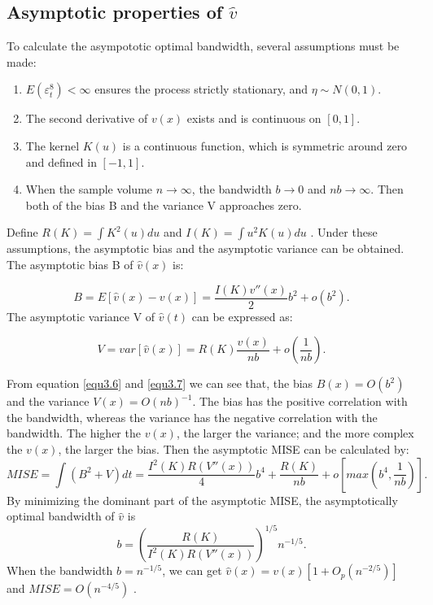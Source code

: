 \subsection{ Asymptotic properties of $\hat{v}$}
To calculate the asympototic optimal bandwidth, several assumptions must be made:
 \begin{enumerate}
    \item $E(\varepsilon_{t}^{8})<\infty$ ensures the process strictly stationary, and $\eta \sim N(0,1)$\citep{Ling2002}.
    \item The second derivative of $v(x)$ exists and is continuous on $[0,1]$.
    \item The kernel $K(u)$ is a continuous function, which is symmetric around zero and defined in $[-1, 1]$.
    
    \item When the sample volume $n \rightarrow \infty $, the bandwidth $b \rightarrow 0 $ and $nb \rightarrow \infty $. Then both of the bias B and the variance V approaches zero.
  
\end{enumerate}
Define $R(K)= \int K^{2}(u)du$ and $I(K)=\int u^{2}K(u)du$ . Under these assumptions, the asymptotic bias and the asymptotic variance can be obtained.
The asymptotic bias B of $\hat{v}(x)$ is:

\begin{equation}
\label{equ3.6}
B=E[\hat{v}(x)-v(x)] = \frac{I(K)v''(x)}{2}b^{2}+o(b^{2}).
\end{equation}
The asymptotic variance V of $\hat{v}(t)$ can be expressed as:

\begin{equation}
\label{equ3.7}
V=var[\hat{v}(x)]=R(K)\frac{v(x)}{nb}+o(\frac{1}{nb}).
\end{equation}   

From equation \ref{equ3.6} and \ref{equ3.7} we can see that, the bias $B(x)=O(b^2)$ and the variance $V(x)=O(nb)^{-1}$. The bias has the positive correlation with the bandwidth, whereas the variance has the negative correlation with the bandwidth. The higher the $v(x)$, the larger the variance; and the more complex the $v(x)$, the larger the bias.
Then the asymptotic MISE can be calculated by:
\begin{equation}
MISE = \int(B^{2}+V)dt=\frac{I^{2}(K)R(V''(x))}{4}b^{4} + \frac{R(K)}{nb} + o[max(b^{4},\frac{1}{nb})].
\end{equation}
By minimizing the dominant part of the asymptotic MISE, the asymptotically optimal bandwidth of $\hat{v}$  is
\begin{equation}
b=(\frac{R(K)}{I^{2}(K)R(V''(x))})^{1/5}n^{-1/5}.
\end{equation}
When the bandwidth $b=n^{-1/5}$, we can get $\hat{v}(x)=v(x)[1+O_{p}(n^{-2/5})]$  and $MISE=O(n^{-4/5})$ \citep{Gasser1984,Fan1991}.

